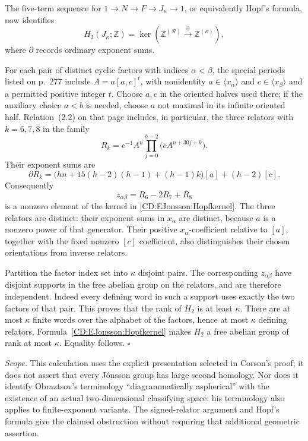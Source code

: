 The five-term sequence for $1\to N\to F\to J_\kappa\to1$,
or equivalently Hopf's formula, now identifies
\begin{equation}\label{CD:EJonsson:Hopfkernel}
 H_2(J_\kappa;\mathbb Z)
 =\ker\!\left(\mathbb Z^{(\mathcal R)}
                 \xrightarrow{\partial}\mathbb Z^{(\kappa)}\right),
\end{equation}
where $\partial$ records ordinary exponent sums.

For each pair of distinct cyclic factors with indices $\alpha<\beta$,
the special periods listed on p.~277 include
$A=a[a,c]^t$, with nonidentity $a\in\langle x_\alpha\rangle$ and
$c\in\langle x_\beta\rangle$ and a permitted positive integer $t$.
Choose $a,c$ in the oriented halves used there; if the auxiliary
choice $a<b$ is needed, choose $a$ not maximal in its infinite
oriented half. Relation~(2.2) on that page includes, in particular,
the three relators with $k=6,7,8$ in the family
\[
 R_k=c^{-1}A^n
       \prod_{j=0}^{h-2}\bigl(c A^{n+30j+k}\bigr).
\]
Their exponent sums are
\[
 \partial R_k
 =\bigl(hn+15(h-2)(h-1)+(h-1)k\bigr)[a]+(h-2)[c].
\]
Consequently
\[
                    z_{\alpha\beta}=R_6-2R_7+R_8
\]
is a nonzero element of the kernel in
\eqref{CD:EJonsson:Hopfkernel}. The three relators are distinct:
their exponent sums in $x_\alpha$ are distinct, because $a$ is a
nonzero power of that generator. Their positive $x_\alpha$-coefficient
relative to $[a]$, together with the fixed nonzero $[c]$ coefficient,
also distinguishes their chosen orientations from inverse relators.

Partition the factor index set into $\kappa$ disjoint pairs.
The corresponding $z_{\alpha\beta}$ have disjoint supports in the
free abelian group on the relators, and are therefore independent.
Indeed every defining word in such a support uses exactly the
two factors of that pair. This proves that the rank of $H_2$ is
at least $\kappa$. There are at most $\kappa$ finite words over
the alphabet of the factors, hence at most $\kappa$ defining
relators. Formula~\eqref{CD:EJonsson:Hopfkernel} makes $H_2$ a
free abelian group of rank at most $\kappa$. Equality follows.
\hfill$\square$

\emph{Scope.}
This calculation uses the explicit presentation selected in
Corson's proof; it does not assert that every J\'onsson group has
large second homology. Nor does it identify Obraztsov's terminology
``diagrammatically aspherical'' with the existence of an actual
two-dimensional classifying space: his terminology also applies
to finite-exponent variants. The signed-relator argument and
Hopf's formula give the claimed obstruction without requiring
that additional geometric assertion.
